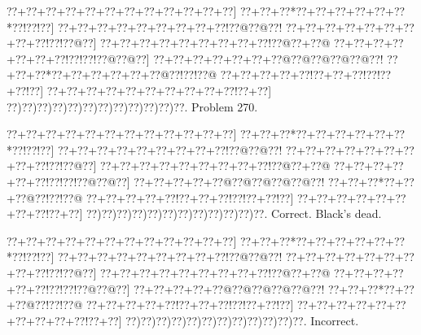 \documentclass[a5paper]{article}
\begin{document}
\newpage
\begin{center}
{\goo
\0??+\0??+\0??+\0??+\0??+\0??+\0??+\0??+\0??+\0??+\0??+\0??]
\0??+\0??+\0??*\0??+\0??+\0??+\0??+\0??+\0??*\0??!\0??!\0??]
\0??+\0??+\0??+\0??+\0??+\0??+\0??+\0??+\0??!\0??@\0??@\0??!
\0??+\0??+\0??+\0??+\0??+\0??+\0??+\0??+\0??!\0??!\0??@\0??]
\0??+\0??+\0??+\0??+\0??+\0??+\0??+\0??+\0??!\0??@\0??+\0??@
\0??+\0??+\0??+\0??+\0??+\0??+\0??!\0??!\0??!\0??@\0??@\0??]
\0??+\0??+\0??+\0??+\0??+\0??+\0??@\0??@\0??@\0??@\0??@\0??!
\0??+\0??+\0??*\0??+\0??+\0??+\0??+\0??+\0??@\0??!\0??!\0??@
\0??+\0??+\0??+\0??+\0??!\0??+\0??+\0??!\0??!\0??+\0??!\0??]
\0??+\0??+\0??+\0??+\0??+\0??+\0??+\0??+\0??+\0??!\0??+\0??]
\0??)\0??)\0??)\0??)\0??)\0??)\0??)\0??)\0??)\0??)\0??)\0??.
}
Problem 270.

\end{center}
\begin{center}
{\goo
\0??+\0??+\0??+\0??+\0??+\0??+\0??+\0??+\0??+\0??+\0??+\0??]
\0??+\0??+\0??*\0??+\0??+\0??+\0??+\0??+\0??*\0??!\0??!\0??]
\0??+\0??+\0??+\0??+\0??+\0??+\0??+\0??+\0??!\0??@\0??@\0??!
\0??+\0??+\0??+\0??+\0??+\0??+\0??+\0??+\0??!\0??!\0??@\0??]
\0??+\0??+\0??+\0??+\0??+\0??+\0??+\0??+\0??!\0??@\0??+\0??@
\0??+\0??+\0??+\0??+\0??+\0??!\0??!\0??!\0??@\0??@\0??]
\0??+\0??+\0??+\0??+\0??@\0??@\0??@\0??@\0??@\0??!
\0??+\0??+\0??*\0??+\0??+\0??@\0??!\0??!\0??@
\0??+\0??+\0??+\0??+\0??!\0??+\0??+\0??!\0??!\0??+\0??!\0??]
\0??+\0??+\0??+\0??+\0??+\0??+\0??+\0??!\0??+\0??]
\0??)\0??)\0??)\0??)\0??)\0??)\0??)\0??)\0??)\0??)\0??)\0??.
}
Correct. Black's dead.

\end{center}
\begin{center}
{\goo
\0??+\0??+\0??+\0??+\0??+\0??+\0??+\0??+\0??+\0??+\0??+\0??]
\0??+\0??+\0??*\0??+\0??+\0??+\0??+\0??+\0??*\0??!\0??!\0??]
\0??+\0??+\0??+\0??+\0??+\0??+\0??+\0??+\0??!\0??@\0??@\0??!
\0??+\0??+\0??+\0??+\0??+\0??+\0??+\0??+\0??!\0??!\0??@\0??]
\0??+\0??+\0??+\0??+\0??+\0??+\0??+\0??+\0??!\0??@\0??+\0??@
\0??+\0??+\0??+\0??+\0??+\0??!\0??!\0??!\0??@\0??@\0??]
\0??+\0??+\0??+\0??+\0??@\0??@\0??@\0??@\0??@\0??!
\0??+\0??+\0??*\0??+\0??+\0??@\0??!\0??!\0??@
\0??+\0??+\0??+\0??+\0??!\0??+\0??+\0??!\0??!\0??+\0??!\0??]
\0??+\0??+\0??+\0??+\0??+\0??+\0??+\0??+\0??+\0??!\0??+\0??]
\0??)\0??)\0??)\0??)\0??)\0??)\0??)\0??)\0??)\0??)\0??)\0??.
}
Incorrect. 

\end{center}
\end{document}
